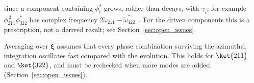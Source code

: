 %




since a component containing $\phi_i^*$ grows, rather than decays, with $\gamma_i$; for example $\phi_{211}^{\,2}\phi_{322}^{*}$ has complex frequency $2\tilde\omega_{211}-\tilde\omega_{322}^{*}$~\cite{Omiya_2022}. For the driven components this is a prescription, not a derived result; see Section~\ref{sec:open_issues}.



Averaging over $\boldsymbol\xi$ assumes that every phase combination surviving the azimuthal integration oscillates fast compared with the evolution. This holds for $\ket{211}$ and $\ket{322}$, and must be rechecked when more modes are added (Section~\ref{sec:open_issues}).



